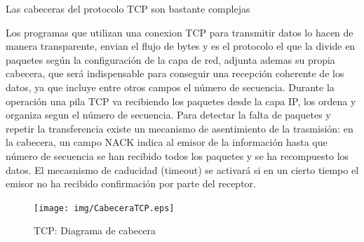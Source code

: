 \documentclass[a4paper,spanish,12pt]{book}
\begin{document}
Las cabeceras del protocolo TCP son bastante complejas

Los programas que utilizan una conexion TCP para transmitir datos lo hacen de manera transparente, envian el flujo de bytes y es el protocolo el que la divide en paquetes según la configuración de la capa de red, adjunta ademas su propia cabecera, que será indispensable para conseguir una recepción coherente de los datos, ya que incluye entre otros campos el número de secuencia. Durante la operación una pila TCP va recibiendo los paquetes desde la capa IP, los ordena y organiza segun el número de secuencia. Para detectar la falta de paquetes y repetir la transferencia existe un mecanismo de asentimiento de la trasmisión: en la cabecera, un campo NACK indica al emisor de la información hasta que número de secuencia se han recibido todos los paquetes y se ha recompuesto los datos. El mecasnismo de caducidad (timeout) se activará si en un cierto tiempo el emisor no ha recibido confirmación por parte del receptor.
\begin{figure}[h]
	\begin{center}
	\texttt{[image: img/CabeceraTCP.eps]}	
\end{center}
\caption{TCP: Diagrama de cabecera}
  \label{fig:CabeceraTCP}
\end{figure}
\end{document}
